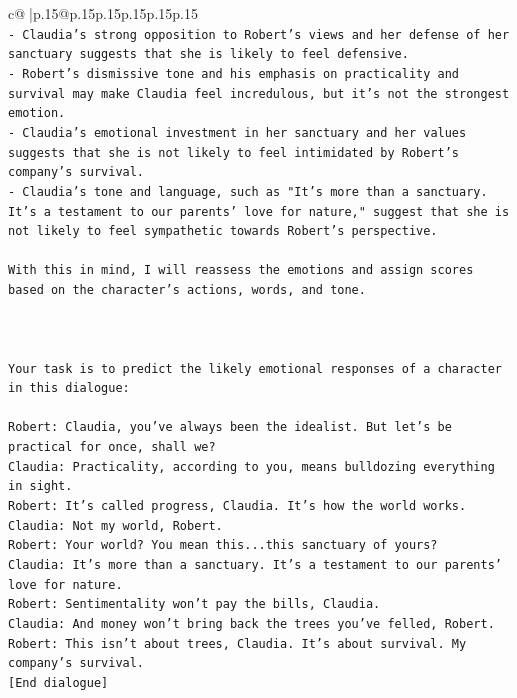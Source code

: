 \documentclass{article}
\begin{document}
{\begin{supertabular}{c@{$\;$}|p{.15\linewidth}@{}p{.15\linewidth}p{.15\linewidth}p{.15\linewidth}p{.15\linewidth}p{.15\linewidth}}
{{{\\ 
\texttt{{-} Claudia's strong opposition to Robert's views and her defense of her sanctuary suggests that she is likely to feel defensive.} \\
\texttt{{-} Robert's dismissive tone and his emphasis on practicality and survival may make Claudia feel incredulous, but it's not the strongest emotion.} \\
\texttt{{-} Claudia's emotional investment in her sanctuary and her values suggests that she is not likely to feel intimidated by Robert's company's survival.} \\
\texttt{{-} Claudia's tone and language, such as "It's more than a sanctuary. It's a testament to our parents' love for nature," suggest that she is not likely to feel sympathetic towards Robert's perspective.} \\
\\ 
\texttt{With this in mind, I will reassess the emotions and assign scores based on the character's actions, words, and tone.} \\
\\ 
\\ 
\\ 
\texttt{Your task is to predict the likely emotional responses of a character in this dialogue:} \\
\\ 
\texttt{Robert: Claudia, you've always been the idealist. But let's be practical for once, shall we?} \\
\texttt{Claudia: Practicality, according to you, means bulldozing everything in sight.} \\
\texttt{Robert: It's called progress, Claudia. It's how the world works.} \\
\texttt{Claudia: Not my world, Robert.} \\
\texttt{Robert: Your world? You mean this...this sanctuary of yours?} \\
\texttt{Claudia: It's more than a sanctuary. It's a testament to our parents' love for nature.} \\
\texttt{Robert: Sentimentality won't pay the bills, Claudia.} \\
\texttt{Claudia: And money won't bring back the trees you've felled, Robert.} \\
\texttt{Robert: This isn't about trees, Claudia. It's about survival. My company's survival.} \\
\texttt{{[}End dialogue{]}} \\
\\ 
}}}
\end{supertabular}}
\end{document}
